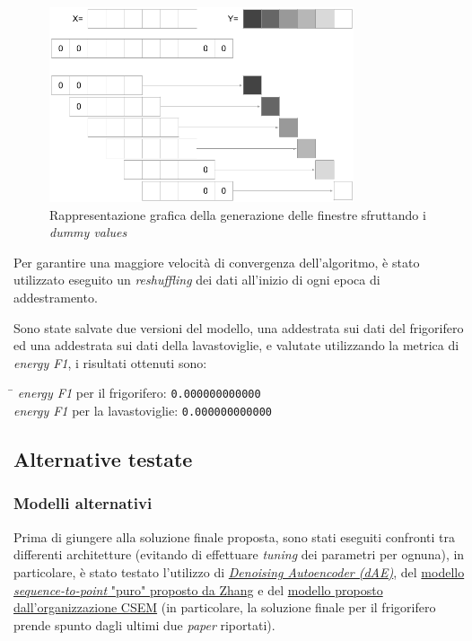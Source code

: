 \documentclass[12pt,a4paper,fleqn]{article}
\begin{document}
\begin{figure}
\centering
\includegraphics[width=0.8\textwidth]{images/padding.png}
\caption{Rappresentazione grafica della generazione delle finestre sfruttando i \textsl{dummy values}}
\label{fig:padding}
\end{figure}

Per garantire una maggiore velocità di convergenza dell'algoritmo, è stato utilizzato eseguito un \textsl{reshuffling} dei dati all'inizio di ogni epoca di addestramento.

Sono state salvate due versioni del modello, una addestrata sui dati del frigorifero ed una addestrata sui dati della lavastoviglie, e valutate utilizzando la metrica di \textsl{energy F1}, i risultati ottenuti sono:

\begin{tabbing}
\hspace{2.50in}     \= \hspace{1.00in}		\kill
\textsl{energy F1} per il frigorifero: \> \texttt{0.000000000000}\\
\textsl{energy F1} per la lavastoviglie: \> \texttt{0.000000000000}
\end{tabbing}

\subsection{Alternative testate}

\subsubsection{Modelli alternativi}
Prima di giungere alla soluzione finale proposta, sono stati eseguiti confronti tra differenti architetture (evitando di effettuare \textsl{tuning} dei parametri per ognuna), in particolare, è stato testato l'utilizzo di \href{https://arxiv.org/abs/1507.06594}{\textsl{Denoising Autoencoder (dAE)}}, del \href{https://arxiv.org/abs/1612.09106}{modello \textsl{sequence-to-point} "puro" proposto da Zhang} e del \href{http://nilmworkshop.org/2018/proceedings/Poster_ID20.pdf}{modello proposto dall'organizzazione CSEM} (in particolare, la soluzione finale per il frigorifero prende spunto dagli ultimi due \textsl{paper} riportati).
\end{document}
